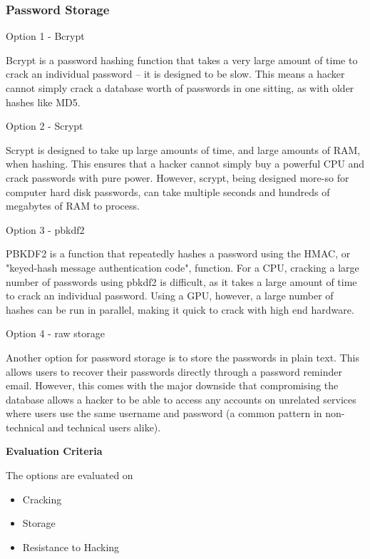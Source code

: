 \documentclass[letterpaper, 10pt, draftclsnofoot, compsoc, onecolumn]{IEEEtran}
\begin{document}
{\newpage
\medskip
\subsubsection{Password Storage}
{\noindent \par}
{\noindent Option 1 - Bcrypt \par}
{\noindent Bcrypt is a password hashing function that takes a very large amount of time to crack
an individual password -- it is designed to be slow. This means a hacker cannot simply crack
a database worth of passwords in one sitting, as with older hashes like MD5. \par}
{\noindent Option 2 - Scrypt \par}
{\noindent Scrypt is designed to take up large amounts of time, and large amounts of RAM,
when hashing. This ensures that a hacker cannot simply buy a powerful CPU and crack passwords with
pure power. However, scrypt, being designed more-so for computer hard disk passwords, can take
multiple seconds and hundreds of megabytes of RAM to process. \par}
{\noindent Option 3 - pbkdf2 \par}
{\noindent PBKDF2 is a function that repeatedly hashes a password using the HMAC, or "keyed-hash
message authentication code", function. For a CPU, cracking a large number of passwords using pbkdf2
is difficult, as it takes a large amount of time to crack an individual password. Using a GPU,
however, a large number of hashes can be run in parallel, making it quick to crack with high end hardware. \par}
{\noindent Option 4 - raw storage \par}
{\noindent Another option for password storage is to store the passwords in plain text. This allows
users to recover their passwords directly through a password reminder email. However, this comes with
the major downside that compromising the database allows a hacker to be able to access any
accounts on unrelated services where users use the same username and password (a common pattern
in non-technical and technical users alike). \par}

\medskip
\newpage
{\noindent\rmfamily\bfseries\color{black} Evaluation Criteria \par}
{\noindent The options are evaluated on

\begin{itemize}
\item Cracking
\item Storage
\item Resistance to Hacking
\end{itemize}

}}
\end{document}
